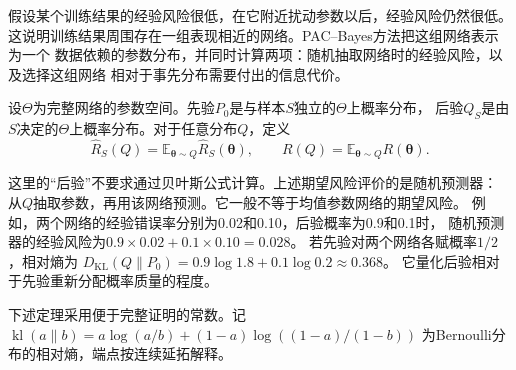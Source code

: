 假设某个训练结果的经验风险很低，在它附近扰动参数以后，经验风险仍然很低。
这说明训练结果周围存在一组表现相近的网络。PAC--Bayes方法把这组网络表示为一个
数据依赖的参数分布，并同时计算两项：随机抽取网络时的经验风险，以及选择这组网络
相对于事先分布需要付出的信息代价。

\begin{definition}
\label{def:pac-bayes-distributions}
设$\Theta$为完整网络的参数空间。先验$P_0$是与样本$S$独立的$\Theta$上概率分布，
后验$Q_S$是由$S$决定的$\Theta$上概率分布。对于任意分布$Q$，定义
\[
 \hat R_S(Q)=\mathbb E_{\bm\theta\sim Q}\hat R_S(\bm\theta),
 \qquad R(Q)=\mathbb E_{\bm\theta\sim Q}R(\bm\theta).
\]
\end{definition}

这里的“后验”不要求通过贝叶斯公式计算。上述期望风险评价的是随机预测器：
从$Q$抽取参数，再用该网络预测。它一般不等于均值参数网络的期望风险。
例如，两个网络的经验错误率分别为0.02和0.10，后验概率为0.9和0.1时，
随机预测器的经验风险为$0.9\times0.02+0.1\times0.10=0.028$。
若先验对两个网络各赋概率$1/2$，相对熵为
$D_{\mathrm{KL}}(Q\|P_0)=0.9\log1.8+0.1\log0.2\approx0.368$。
它量化后验相对于先验重新分配概率质量的程度。

下述定理采用便于完整证明的常数。记
$\operatorname{kl}(a\|b)=a\log(a/b)+(1-a)\log((1-a)/(1-b))$
为Bernoulli分布的相对熵，端点按连续延拓解释。

